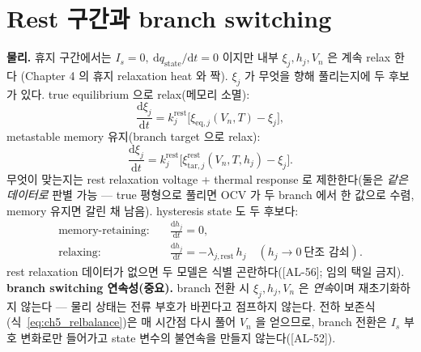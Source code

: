 \documentclass[11pt,a4paper]{article}
\newcommand{\dd}{\mathrm{d}}
\newcommand{\eq}{\mathrm{eq}}
\newcommand{\rst}{\mathrm{rest}}
\newcommand{\tar}{\mathrm{tar}}
\newcommand{\stt}{\mathrm{state}}
\newcommand{\AL}[1]{\textsf{[AL-#1]}}
\begin{document}
\section{Rest 구간과 branch switching}\label{sec:ch5_rest}
\textbf{물리.} 휴지 구간에서는 $I_s=0,\ \dd q_\stt/\dd t=0$ 이지만 내부 $\xi_j,h_j,V_n$ 은 계속 relax 한다
(Chapter 4 의 휴지 relaxation heat 와 짝). $\xi_j$ 가 무엇을 향해 풀리는지에 두 후보가 있다. true equilibrium
으로 relax(메모리 소멸):
\begin{equation}
\frac{\dd\xi_j}{\dd t}=k_j^\rst\big[\xi_{\eq,j}(V_n,T)-\xi_j\big],
\label{eq:ch5_rest_eq}
\end{equation}
metastable memory 유지(branch target 으로 relax):
\begin{equation}
\frac{\dd\xi_j}{\dd t}=k_j^\rst\big[\xi_{\tar,j}^\rst(V_n,T,h_j)-\xi_j\big].
\label{eq:ch5_rest_meta}
\end{equation}
무엇이 맞는지는 rest relaxation voltage + thermal response 로 제한한다(둘은 \emph{같은 데이터로} 판별 가능 —
true 평형으로 풀리면 OCV 가 두 branch 에서 한 값으로 수렴, memory 유지면 갈린 채 남음). hysteresis state 도
두 후보다:
\begin{align}
\text{memory-retaining:}\quad &\frac{\dd h_j}{\dd t}=0,\label{eq:ch5_h_rest_mem}\\
\text{relaxing:}\quad &\frac{\dd h_j}{\dd t}=-\lambda_{j,\rst}\,h_j\quad(h_j\to0\ \text{단조 감쇠}).\label{eq:ch5_h_rest_relax}
\end{align}
rest relaxation 데이터가 없으면 두 모델은 식별 곤란하다(\AL{56}; 임의 택일 금지). \textbf{branch switching
연속성(중요).} branch 전환 시 $\xi_j,h_j,V_n$ 은 \emph{연속}이며 재초기화하지 않는다 — 물리 상태는 전류
부호가 바뀐다고 점프하지 않는다. 전하 보존식(식~\eqref{eq:ch5_relbalance})은 매 시간점 다시 풀어 $V_n$ 을
얻으므로, branch 전환은 $I_s$ 부호 변화로만 들어가고 state 변수의 불연속을 만들지 않는다(\AL{52}).

\end{document}
